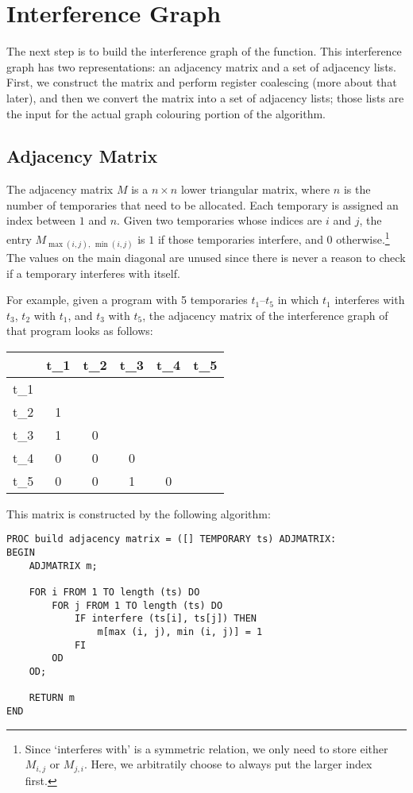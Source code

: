 \documentclass[12pt]{report}
\begin{document}
\section{Interference Graph}
The next step is to build the interference graph of the function. This interference graph has two representations: an adjacency matrix and
a set of adjacency lists. First, we construct the matrix and perform register coalescing (more about that later), and then we convert the
matrix into a set of adjacency lists; those lists are the input for the actual graph colouring portion of the algorithm.

\subsection{Adjacency Matrix}
The adjacency matrix $M$ is a $n×n$ lower triangular matrix, where $n$ is the number of temporaries that need to be allocated. Each temporary
is assigned an index between $1$ and $n$. Given two temporaries whose indices are $i$ and $j$, the entry $M_{\max(i,j),\,\min(i, j)}$ is $1$ if
those temporaries interfere, and $0$ otherwise.\footnote{Since ‘interferes with’ is a symmetric relation, we only need to store either
$M_{i,j}$ or $M_{j, i}$. Here, we arbitratily choose to always put the larger index first.} The values on the main diagonal are unused since
there is never a reason to check if a temporary interferes with itself.

For example, given a program with 5 temporaries $t_1$–$t_5$ in which $t_1$ interferes with $t_3$, $t_2$ with $t_1$, and $t_3$ with $t_5$, the
adjacency matrix of the interference graph of that program looks as follows:\medskip

\noindent\begin{tabular}{@{}C|CCCCC}
 & t_1& t_2& t_3& t_4& t_5\\\hline
t_1& & & & & \\
t_2&1& & & & \\
t_3&1&0& & & \\
t_4&0&0&0& & \\
t_5&0&0&1&0& \\
\end{tabular}\medskip

\noindent This matrix is constructed by the following algorithm:
\begin{lstlisting}
PROC build adjacency matrix = ([] TEMPORARY ts) ADJMATRIX:
BEGIN
    ADJMATRIX m;

    FOR i FROM 1 TO length (ts) DO
        FOR j FROM 1 TO length (ts) DO
            IF interfere (ts[i], ts[j]) THEN
                m[max (i, j), min (i, j)] = 1
            FI
        OD
    OD;

    RETURN m
END
\end{lstlisting}
\end{document}
